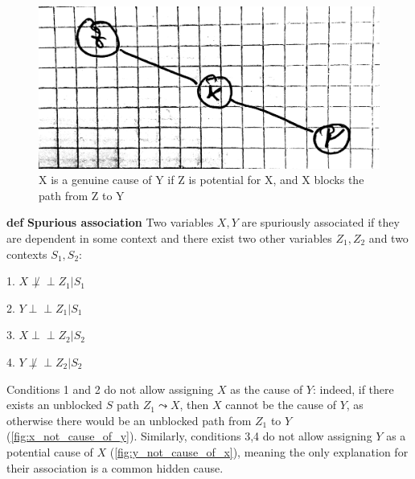 \documentclass[fleqn]{article}
\newcommand{\independent}{\perp \!\!\! \perp}
\def\define#1{\textbf{def} \textbf{#1}}
\numberwithin{equation}{section}
\numberwithin{theorem}{section}
\numberwithin{figure}{section}
\numberwithin{lemma}{section}
\numberwithin{corollary}{section}
\begin{document}
\begin{figure}[h]
	\begin{center}
		\includegraphics[scale=0.07]{imgs/img18.png}
	\end{center}
	\caption{X is a genuine cause of Y if Z is potential for X, and X blocks the path from Z to Y}
	\label{fig:x_genuine_cause_of_y}
\end{figure}

\define{Spurious association} Two variables $X, Y$ are spuriously associated if they are dependent in some context and there exist two other variables $Z_1, Z_2$ and two contexts $S_1, S_2$:

1. $X \not \independent Z_1 | S_1$

2. $Y \independent Z_1 | S_1$

3. $X \independent Z_2 | S_2$

4. $Y \not \independent Z_2 | S_2$

Conditions 1 and 2 do not allow assigning $X$ as the cause of $Y$: indeed, if there exists an unblocked $S$ path $Z_1 \leadsto X$, then $X$ cannot be the cause of $Y$, as otherwise there would be an unblocked path from $Z_1$ to $Y$ (\ref{fig:x_not_cause_of_y}). Similarly, conditions 3,4 do not allow assigning $Y$ as a potential cause of $X$ (\ref{fig:y_not_cause_of_x}), meaning the only explanation for their association is a common hidden cause.
\end{document}
